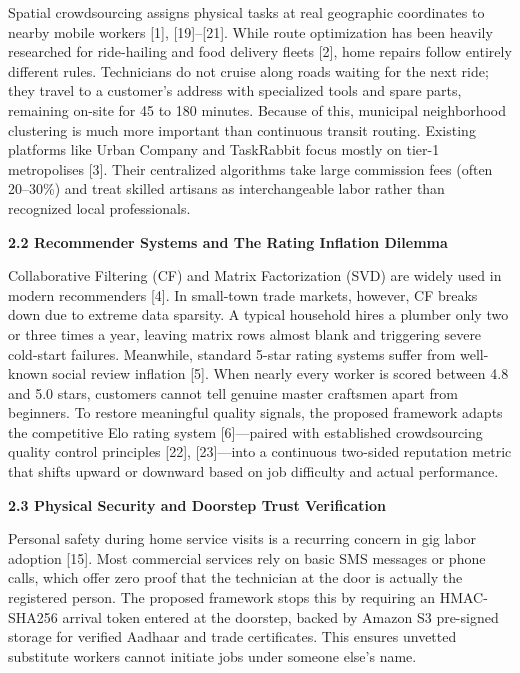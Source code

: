 \documentclass[10pt,twocolumn,a4paper]{article}
\begin{document}
Spatial crowdsourcing assigns physical tasks at real geographic coordinates to nearby mobile workers [1], [19]--[21]. While route optimization has been heavily researched for ride-hailing and food delivery fleets [2], home repairs follow entirely different rules. Technicians do not cruise along roads waiting for the next ride; they travel to a customer's address with specialized tools and spare parts, remaining on-site for 45 to 180 minutes. Because of this, municipal neighborhood clustering is much more important than continuous transit routing. Existing platforms like Urban Company and TaskRabbit focus mostly on tier-1 metropolises [3]. Their centralized algorithms take large commission fees (often 20--30\%) and treat skilled artisans as interchangeable labor rather than recognized local professionals.

\vspace{0.35em}
\noindent
\textbf{2.2 Recommender Systems and The Rating Inflation Dilemma}

Collaborative Filtering (CF) and Matrix Factorization (SVD) are widely used in modern recommenders [4]. In small-town trade markets, however, CF breaks down due to extreme data sparsity. A typical household hires a plumber only two or three times a year, leaving matrix rows almost blank and triggering severe cold-start failures. Meanwhile, standard 5-star rating systems suffer from well-known social review inflation [5]. When nearly every worker is scored between 4.8 and 5.0 stars, customers cannot tell genuine master craftsmen apart from beginners. To restore meaningful quality signals, the proposed framework adapts the competitive Elo rating system [6]---paired with established crowdsourcing quality control principles [22], [23]---into a continuous two-sided reputation metric that shifts upward or downward based on job difficulty and actual performance.

\vspace{0.35em}
\noindent
\textbf{2.3 Physical Security and Doorstep Trust Verification}

Personal safety during home service visits is a recurring concern in gig labor adoption [15]. Most commercial services rely on basic SMS messages or phone calls, which offer zero proof that the technician at the door is actually the registered person. The proposed framework stops this by requiring an HMAC-SHA256 arrival token entered at the doorstep, backed by Amazon S3 pre-signed storage for verified Aadhaar and trade certificates. This ensures unvetted substitute workers cannot initiate jobs under someone else's name.
\end{document}
